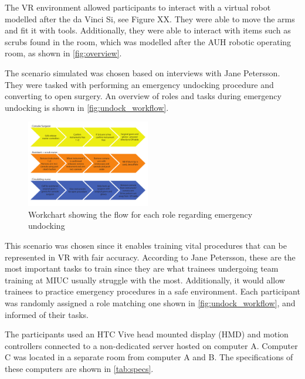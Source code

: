 \documentclass[conference]{IEEEtran}
\begin{document}
The VR environment allowed participants to interact with a virtual robot modelled after the da Vinci Si, see Figure XX. They were able to move the arms and fit it with tools. Additionally, they were able to interact with items such as scrubs found in the room, which was modelled after the AUH robotic operating room, as shown in \autoref{fig:overview}.


The scenario simulated was chosen based on interviews with Jane Petersson. They were tasked with performing an emergency undocking procedure and converting to open surgery. An overview of roles and tasks during emergency undocking is shown in \autoref{fig:undock_workflow}.

\begin{figure}[h]
	\centering
	\includegraphics[width=0.48\textwidth]{figures/workflow_chart}
	\caption{Workchart showing the flow for each role regarding emergency undocking}
	\label{fig:undock_workflow}
\end{figure}

This scenario was chosen since it enables training vital procedures that can be represented in VR with fair accuracy. According to Jane Petersson, these are the most important tasks to train since they are what trainees undergoing team training at MIUC usually struggle with the most. Additionally, it would allow trainees to practice emergency procedures in a safe environment. Each participant was randomly assigned a role matching one shown in \autoref{fig:undock_workflow}, and informed of their tasks.

The participants used an HTC Vive head mounted display (HMD) and motion controllers connected to a non-dedicated server hosted on computer A. Computer C was located in a separate room from computer A and B. The specifications of these computers are shown in \autoref{tab:specs}. 
\end{document}
